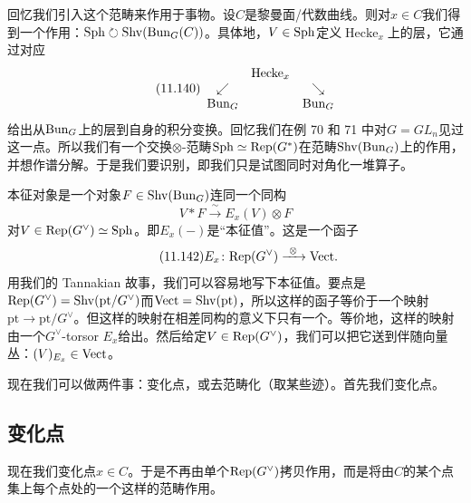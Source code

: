 回忆我们引入这个范畴来作用于事物。设$C$是黎曼面/代数曲线。则对$x\in C$我们得到一个作用：$\mathrm{Sph}\circlearrowright\mathrm{Shv}(\mathrm{Bun}_G(C))$。具体地，$V\in\mathrm{Sph}$定义$\operatorname{Hecke}_x$上的层，它通过对应
\begin{equation}\tag{11.140}
\begin{array}{ccc}
 & \operatorname{Hecke}_x & \\
 \swarrow & & \searrow\\
 \mathrm{Bun}_G & & \mathrm{Bun}_G
\end{array}
\end{equation}
给出从$\mathrm{Bun}_G$上的层到自身的积分变换。回忆我们在例 70 和 71 中对$G=GL_n$见过这一点。所以我们有一个交换$\otimes$-范畴$\mathrm{Sph}\simeq\mathrm{Rep}(G^{*})$在范畴$\mathrm{Shv}(\mathrm{Bun}_G)$上的作用，并想作谱分解。于是我们要识别，即我们只是试图同时对角化一堆算子。

本征对象是一个对象$F\in\mathrm{Shv}(\mathrm{Bun}_G)$连同一个同构
\begin{equation}\tag{11.141}
V*F\xrightarrow{\ \sim\ }E_x(V)\otimes F
\end{equation}
对$V\in\mathrm{Rep}(G^{\vee})\simeq\mathrm{Sph}$。即$E_x(-)$是“本征值”。这是一个函子
\begin{equation}\tag{11.142}
E_x\colon\mathrm{Rep}(G^{\vee})\xrightarrow{\ \otimes\ }\mathrm{Vect}.
\end{equation}
用我们的 Tannakian 故事，我们可以容易地写下本征值。要点是$\mathrm{Rep}(G^{\vee})=\mathrm{Shv}(\mathrm{pt}/G^{\vee})$而$\mathrm{Vect}=\mathrm{Shv}(\mathrm{pt})$，所以这样的函子等价于一个映射$\mathrm{pt}\to\mathrm{pt}/G^{\vee}$。但这样的映射在相差同构的意义下只有一个。等价地，这样的映射由一个$G^{\vee}$-torsor $E_x$给出。然后给定$V\in\mathrm{Rep}(G^{\vee})$，我们可以把它送到伴随向量丛：$(V)_{E_x}\in\mathrm{Vect}$。

现在我们可以做两件事：变化点，或去范畴化（取某些迹）。首先我们变化点。


\subsection{变化点}\label{sec:11-7-3}

现在我们变化点$x\in C$。于是不再由单个$\mathrm{Rep}(G^{\vee})$拷贝作用，而是将由$C$的某个点集上每个点处的一个这样的范畴作用。


